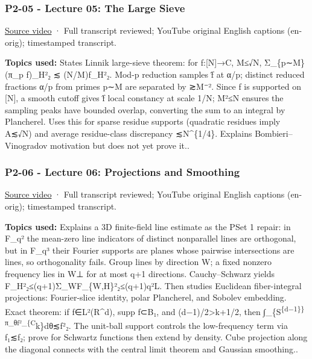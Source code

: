 \subsubsection{P2-05 - Lecture 05: The Large Sieve}\label{04-visual-computing-ii-ch036-p2-05---lecture-05-the-large-sieve}

\hypertarget{04-visual-computing-ii-ch036-p2-05---lecture-05-the-large-sieve}{}

\href{https://www.youtube.com/watch?v=i5lpHaGpeaI}{Source video} · Full transcript reviewed; YouTube original English captions (en-orig); timestamped transcript.

\textbf{Topics used:} States Linnik large-sieve theorem: for f:{[}N{]}→C, M≤√N, Σ\_\{p∼M\}\textbar\textbar(π\_p f)\_H\textbar\textbar²₂ ≲ (N/M)\textbar\textbar f\_H\textbar\textbar²₂. Mod-p reduction samples f̂ at α/p; distinct reduced fractions α/p from primes p∼M are separated by ≳M⁻². Since f is supported on {[}N{]}, a smooth cutoff gives f̂ local constancy at scale 1/N; M²≤N ensures the sampling peaks have bounded overlap, converting the sum to an integral by Plancherel. Uses this for sparse residue supports (quadratic residues imply \textbar A\textbar≲√N) and average residue-class discrepancy ≲N\^{}\{1/4\}. Explains Bombieri--Vinogradov motivation but does not yet prove it..

\subsubsection{P2-06 - Lecture 06: Projections and Smoothing}\label{04-visual-computing-ii-ch036-p2-06---lecture-06-projections-and-smoothing}

\hypertarget{04-visual-computing-ii-ch036-p2-06---lecture-06-projections-and-smoothing}{}

\href{https://www.youtube.com/watch?v=iUB_y1OXBo4}{Source video} · Full transcript reviewed; YouTube original English captions (en-orig); timestamped transcript.

\textbf{Topics used:} Explains a 3D finite-field line estimate as the PSet 1 repair: in F\_q² the mean-zero line indicators of distinct nonparallel lines are orthogonal, but in F\_q³ their Fourier supports are planes whose pairwise intersections are lines, so orthogonality fails. Group lines by direction W; a fixed nonzero frequency lies in W⊥ for at most q+1 directions. Cauchy--Schwarz yields \textbar\textbar F\_H\textbar\textbar²₂≤(q+1)Σ\_W\textbar\textbar F\_\{W,H\}\textbar\textbar²₂≤(q+1)q²\textbar L\textbar. Then studies Euclidean fiber-integral projections: Fourier-slice identity, polar Plancherel, and Sobolev embedding. Exact theorem: if f∈L²(R\^{}d), supp f⊂B₁, and (d−1)/2\textgreater k+1/2, then ∫\_\{S\textsuperscript{\{d−1\}\}\textbar\textbar π\_θf\textbar\textbar²\_\{C}k\}dθ≲\textbar\textbar f\textbar\textbar²₂. The unit-ball support controls the low-frequency term via \textbar\textbar f\textbar\textbar₁≲\textbar\textbar f\textbar\textbar₂; prove for Schwartz functions then extend by density. Cube projection along the diagonal connects with the central limit theorem and Gaussian smoothing..

